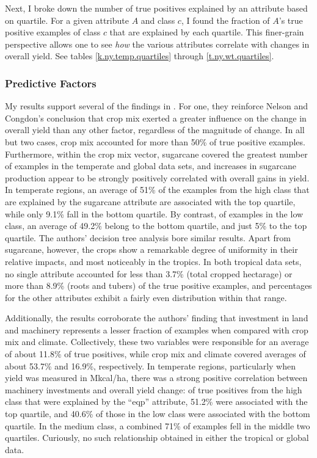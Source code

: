 \documentclass[12pt,twoside]{article}
\begin{document}
Next, I broke down the number of true positives explained by an attribute based on quartile. For a given attribute $A$ and class $c$, I found the fraction of $A$'s true positive examples of class $c$ that are explained by each quartile. This finer-grain perspective allows one to see \emph{how} the various attributes correlate with changes in overall yield. See tables \ref{k.ny.temp.quartiles} through \ref{t.ny.wt.quartiles}.

\subsubsection{Predictive Factors}

My results support several of the findings in \cite{nelson_measuring_2016}. For one, they reinforce Nelson and Congdon's conclusion that crop mix exerted a greater influence on the change in overall yield than any other factor, regardless of the magnitude of change. In all but two cases, crop mix accounted for more than 50\% of true positive examples. Furthermore, within the crop mix vector, sugarcane covered the greatest number of examples in the temperate and global data sets, and increases in sugarcane production appear to be strongly positively correlated with overall gains in yield. In temperate regions, an average of 51\% of the examples from the high class that are explained by the sugarcane attribute are associated with the top quartile, while only 9.1\% fall in the bottom quartile. By contrast, of examples in the low class, an average of 49.2\% belong to the bottom quartile, and just 5\% to the top quartile. The authors' decision tree analysis bore similar results. Apart from sugarcane, however, the crops show a remarkable degree of uniformity in their relative impacts, and most noticeably in the tropics. In both tropical data sets, no single attribute accounted for less than 3.7\% (total cropped hectarage) or more than 8.9\% (roots and tubers) of the true positive examples, and percentages for the other attributes exhibit a fairly even distribution within that range. 

Additionally, the results corroborate the authors' finding that investment in land and machinery represents a lesser fraction of examples when compared with crop mix and climate. Collectively, these two variables were responsible for an average of about 11.8\% of true positives, while crop mix and climate covered averages of about 53.7\% and 16.9\%, respectively. In temperate regions, particularly when yield was measured in Mkcal/ha, there was a strong positive correlation between machinery investments and overall yield change: of true positives from the high class that were explained by the ``eqp'' attribute, 51.2\% were associated with the top quartile, and 40.6\% of those in the low class were associated with the bottom quartile. In the medium class, a combined 71\% of examples fell in the middle two quartiles. Curiously, no such relationship obtained in either the tropical or global data.
\end{document}

